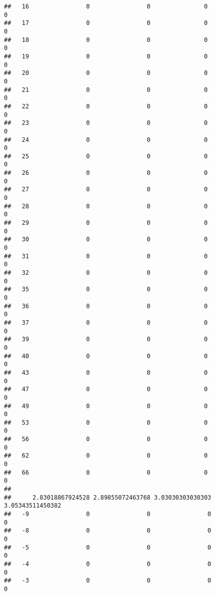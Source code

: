 \documentclass[]{article}
\begin{document}
\begin{verbatim}
##   16                0                0               0               0
##   17                0                0               0               0
##   18                0                0               0               0
##   19                0                0               0               0
##   20                0                0               0               0
##   21                0                0               0               0
##   22                0                0               0               0
##   23                0                0               0               0
##   24                0                0               0               0
##   25                0                0               0               0
##   26                0                0               0               0
##   27                0                0               0               0
##   28                0                0               0               0
##   29                0                0               0               0
##   30                0                0               0               0
##   31                0                0               0               0
##   32                0                0               0               0
##   35                0                0               0               0
##   36                0                0               0               0
##   37                0                0               0               0
##   39                0                0               0               0
##   40                0                0               0               0
##   43                0                0               0               0
##   47                0                0               0               0
##   49                0                0               0               0
##   53                0                0               0               0
##   56                0                0               0               0
##   62                0                0               0               0
##   66                0                0               0               0
##     
##      2.83018867924528 2.89855072463768 3.03030303030303 3.05343511450382
##   -9                0                0                0                0
##   -8                0                0                0                0
##   -5                0                0                0                0
##   -4                0                0                0                0
##   -3                0                0                0                0

\end{verbatim}
\end{document}
